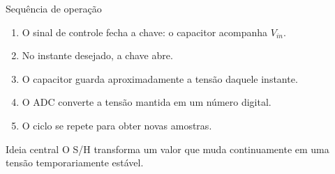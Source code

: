 \begin{frame}{Sequência de operação}
  \begin{enumerate}
    \item O sinal de controle fecha a chave: o capacitor acompanha $V_{in}$.
    \item No instante desejado, a chave abre.
    \item O capacitor guarda aproximadamente a tensão daquele instante.
    \item O ADC converte a tensão mantida em um número digital.
    \item O ciclo se repete para obter novas amostras.
  \end{enumerate}

  \begin{alertblock}{Ideia central}
    O S/H transforma um valor que muda continuamente em uma tensão temporariamente estável.
  \end{alertblock}
\end{frame}